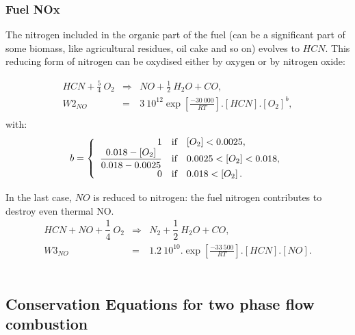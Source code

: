 \subsubsection{Fuel NOx}
The nitrogen included in the organic part of the fuel (can be a significant part
of some biomass, like agricultural residues, oil cake and so on) evolves to
$HCN$. This reducing form of nitrogen can be oxydised either by oxygen or by
nitrogen oxide:

\begin{eqnarray*}
HCN + \frac{5}{4}~ O_{2} &\Rightarrow& NO + \frac{1}{2} ~H_{2}O + CO  ,\\
 W2_{NO} &=& 3 \medspace10^{12} \exp \left[\frac{- 30\medspace000}{RT}\right].\left[ HCN \right] . \left[O_{2}\right]^{\textstyle b},\\
\end{eqnarray*}
with:
\begin{equation*}
b = \left\{
\begin{array}{r c l }
1 &\text{if}&\left[O_{2}\right] < 0.0025, \\
\dfrac{0.018-\left[O_{2}\right]}{0.018-0.0025} & \text{if} &0.0025 < \left[O_{2}\right] < 0.018, \\
0 & \text{if} &0.018 < \left[O_{2}\right]. 
\end{array}
\right.
\end{equation*}

In the last case, $NO$ is reduced to nitrogen: the fuel nitrogen contributes to destroy even thermal NO.
\begin{eqnarray*}
 HCN + NO + \dfrac{1}{4}~ O_{2} &\Rightarrow& N_{2} + \dfrac{1}{2}~ H_{2}O + CO ,  \\
 W3_{NO} &=& 1.2 \medspace 10^{10}  .  \exp \left[\frac{-33\medspace500}{RT}\right].\left[ HCN \right] . \left[NO\right] .
\end{eqnarray*} 
\


\subsection[Conservation Equations]{Conservation Equations for two phase flow combustion}

